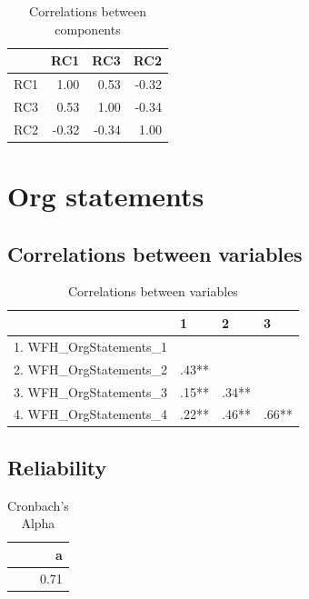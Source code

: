 \documentclass[]{article}
\begin{document}
\begin{table}[H]

\caption{\label{tab:unnamed-chunk-51}Correlations between components}
\centering
\fontsize{6}{8}\selectfont
\begin{tabular}[t]{lrrr}
\toprule
  & RC1 & RC3 & RC2\\
\midrule
RC1 & 1.00 & 0.53 & -0.32\\
RC3 & 0.53 & 1.00 & -0.34\\
RC2 & -0.32 & -0.34 & 1.00\\
\bottomrule
\end{tabular}
\end{table}

\newpage

\hypertarget{org-statements}{%
\section{Org statements}\label{org-statements}}

\hypertarget{correlations-between-variables-10}{%
\subsection{Correlations between
variables}\label{correlations-between-variables-10}}

\begin{table}[H]

\caption{\label{tab:unnamed-chunk-52}Correlations between variables}
\centering
\fontsize{6}{8}\selectfont
\begin{tabular}[t]{llll}
\toprule
  & 1 & 2 & 3\\
\midrule
1. WFH\_OrgStatements\_1 &  &  & \\
2. WFH\_OrgStatements\_2 & .43** &  & \\
3. WFH\_OrgStatements\_3 & .15** & .34** & \\
4. WFH\_OrgStatements\_4 & .22** & .46** & .66**\\
\bottomrule
\end{tabular}
\end{table}

\hypertarget{reliability-9}{%
\subsection{Reliability}\label{reliability-9}}

\begin{table}[H]

\caption{\label{tab:unnamed-chunk-53}Cronbach's Alpha}
\centering
\fontsize{6}{8}\selectfont
\begin{tabular}[t]{r}
\toprule
a\\
\midrule
0.71\\
\bottomrule
\end{tabular}
\end{table}
\end{document}
